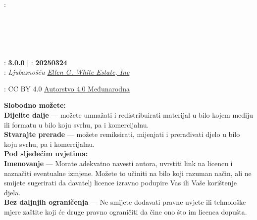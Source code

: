 \clearpage %

{\small
\setlength{\parindent}{0em}\setlength{\parskip}{0.75em}

{\large \emcap{\booktitle}}

: \textbf{\authorname} \\
\ifx\editor\undefined\else\if\relax\detokenize\expandafter{\editor}\relax{} \\ \fi\fi
\ifx\translatedby\undefined\else\if\relax\detokenize\expandafter{\translatedby}\relax{} \\ \fi\fi
\ifx\publisher\undefined\else\if\relax\detokenize\expandafter{\publisher}\relax{} \\ \fi\fi
\ifx\publishingplace\undefined\else\if\relax\detokenize\expandafter{\publishingplace}\relax{} \\ \fi\fi
\ifx\isbn\undefined\else\if\relax\detokenize\expandafter{\isbn}\relax{} \\ \fi\fi
{}: \textbf{3.0.0} | : \textbf{20250324} \\
: \textit{Ljubaznošću \href{https://ellenwhite.org/}{Ellen G. White Estate, Inc}}

\vfill

: \ccby{} CC BY 4.0 \href{https://creativecommons.org/licenses/by/4.0/}{Autorstvo 4.0 Međunarodna}

\textbf{Slobodno možete:} \\
\textbf{Dijelite dalje} — možete umnažati i redistribuirati materijal u bilo kojem mediju ili formatu u bilo koju svrhu, pa i komercijalnu. \\
\textbf{Stvarajte prerade} — možete remiksirati, mijenjati i prerađivati djelo u bilo koju svrhu, pa i komercijalnu.\\ 

\textbf{Pod sljedećim uvjetima:} \\
\textbf{Imenovanje} — Morate adekvatno navesti autora, uvrstiti link na licencu i naznačiti eventualne izmjene. Možete to učiniti na bilo koji razuman način, ali ne smijete sugerirati da davatelj licence izravno podupire Vas ili Vaše korištenje djela. \\
\textbf{Bez daljnjih ograničenja} — Ne smijete dodavati pravne uvjete ili tehnološke mjere zaštite koji će druge pravno ograničiti da čine ono što im licenca dopušta.

}
